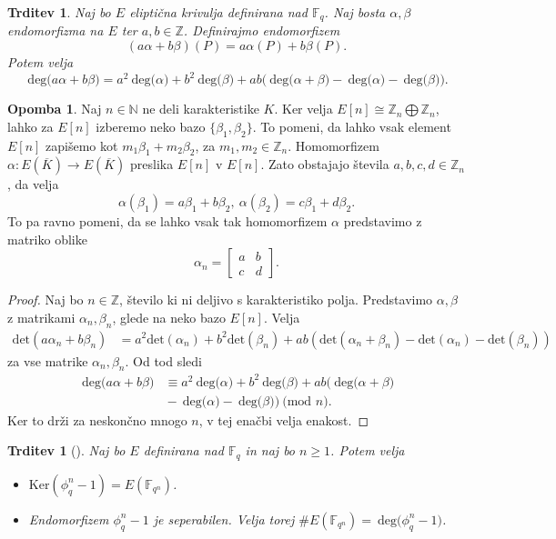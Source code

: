 \documentclass[12pt,a4paper,twoside]{article}
\theoremstyle{definition} %
\newtheorem{opomba}[definicija]{Opomba}
\theoremstyle{plain} %
\newtheorem{trditev}[definicija]{Trditev}
\numberwithin{equation}{section}  %
\newcommand{\N}{\mathbb N}
\newcommand{\Z}{\mathbb Z}
\newcommand{\F}{\mathbb F}
\newcommand{\Fq}[1]{{\mathbb{F}_{#1}}}
\newcommand{\E}[1]{E({#1})}
\newcommand{\MOD}[1]{\ \text{(mod }{#1}\text{)}}
\newcommand{\DEG}[1]{\ \text{deg(}{#1}\text{)}}
\begin{document}
\begin{trditev}
\label{trd:3.16}
Naj bo $E$ eliptična krivulja definirana nad $\Fq{q}$.
Naj bosta $\alpha,\beta$ endomorfizma na $E$ ter $a,b \in \Z$. Definirajmo endomorfizem
$$(a\alpha+b\beta)(P) = a\alpha(P)+b\beta(P).$$
Potem velja
$$\DEG{a\alpha+b\beta} = a^2\DEG{\alpha}+b^2\DEG{\beta} + ab\text{(}\DEG{\alpha+\beta}-\DEG{\alpha}-\DEG{\beta}\text{)}.$$
\end{trditev}

\begin{opomba}
Naj $n \in \N$ ne deli karakteristike $K$. Ker velja $E[n] \cong \Z_n \bigoplus \Z_n$, lahko za $E[n]$ izberemo neko bazo $\{ \beta_1, \beta_2\}$. To pomeni, da lahko vsak element $E[n]$ zapišemo kot $m_1\beta_1 + m_2\beta_2$, za $m_1, m_2 \in \Z_n$. Homomorfizem $\alpha: \E{\overline{K}} \rightarrow \E{\overline{K}}$ preslika $E[n]$ v $E[n]$. Zato obstajajo števila $a,b,c,d \in \Z_n$, da velja
$$\alpha(\beta_1) = a\beta_1+b\beta_2, \ \alpha(\beta_2) = c\beta_1+d\beta_2.$$
To pa ravno pomeni, da se lahko vsak tak homomorfizem $\alpha$ predstavimo z matriko oblike
$$\alpha_n = \begin{bmatrix}
a & b \\
c & d
\end{bmatrix}.$$
\end{opomba}

\begin{proof}
Naj bo $n \in \Z$, število ki ni deljivo s karakteristiko polja. Predstavimo $\alpha,\beta$ z matrikami $\alpha_n,\beta_n$, glede na neko bazo $E[n]$.
Velja
\begin{align}
\text{det}(a\alpha_n+b\beta_n) &{}=  a^2\text{det}(\alpha_n)+b^2\text{det}(\beta_n) + ab(\text{det}(\alpha_n+\beta_n)-\text{det}(\alpha_n)-\text{det}(\beta_n)) \nonumber
\end{align}
za vse matrike $\alpha_n,\beta_n$.
Od tod sledi
\begin{align}
\DEG{a\alpha+b\beta} &{}\equiv a^2\DEG{\alpha}+b^2\DEG{\beta} + ab(\DEG{\alpha+\beta} \nonumber \\
&{}-\DEG{\alpha}-\DEG{\beta}) \MOD{n}. \nonumber
\end{align}
Ker to drži za neskončno mnogo $n$, v tej enačbi velja enakost.


\end{proof}

\begin{trditev}[]
\label{trd:4.7}
Naj bo $E$ definirana nad $\F_q$ in naj bo $n \geq 1$. Potem velja
\begin{itemize}
\item $\text{Ker}(\phi^n_q-1) = \E{\F_{q^n}}$.
\item Endomorfizem $\phi^n_q-1$ je seperabilen. Velja torej $\#\E{\F_{q^n}} = \DEG{\phi^n_q-1}$.
\end{itemize}
\end{trditev}
\end{document}
